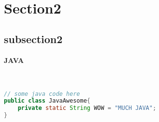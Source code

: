 \documentclass[
10pt, %
letterpaper, %
oneside, %
headinclude,footinclude, %
BCOR5mm, %
]{scrartcl}
\begin{document}

\section{Section2}


\subsection{subsection2}


\paragraph{JAVA}~
\begin{lstlisting}[language=Java]
// some java code here
public class JavaAwesome{
	private static String WOW = "MUCH JAVA";
}
\end{lstlisting}
\end{document}
